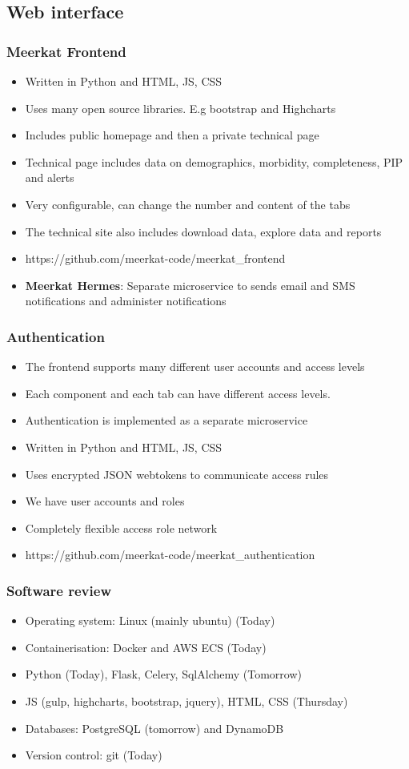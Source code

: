 \documentclass{beamer}
\begin{document}
\subsection{Web interface}
\begin{frame}
  \frametitle{Meerkat Frontend}
  \begin{itemize}
  \item Written in Python and HTML, JS, CSS
  \item Uses many open source libraries. E.g bootstrap and Highcharts
  \item Includes public homepage and then a private technical page
  \item Technical page includes data on demographics, morbidity, completeness, PIP and alerts
  \item Very configurable, can change the number and content of the tabs
  \item The technical site also includes download data, explore data and reports
  \item https://github.com/meerkat-code/meerkat\_frontend
  \item {\bf Meerkat Hermes}: Separate microservice to sends email and SMS notifications and administer notifications
  \end{itemize}
\end{frame}
\begin{frame}
  \frametitle{Authentication}
  \begin{itemize}
  \item The frontend supports many different user accounts and access levels
  \item Each component and each tab can have different access levels. 
  \item Authentication is implemented as a separate microservice
  \item Written in Python and HTML, JS, CSS
  \item Uses encrypted JSON webtokens to communicate access rules
  \item We have user accounts and roles
  \item Completely flexible access role network
  \item https://github.com/meerkat-code/meerkat\_authentication
  \end{itemize}
\end{frame}



\begin{frame}
  \frametitle{Software review}
  \begin{itemize}
  \item Operating system: Linux (mainly ubuntu) (Today)
  \item Containerisation: Docker and AWS ECS (Today)
  \item Python (Today), Flask, Celery, SqlAlchemy (Tomorrow)
  \item JS (gulp, highcharts, bootstrap, jquery), HTML, CSS (Thursday)
  \item Databases: PostgreSQL (tomorrow) and DynamoDB 
  \item Version control: git (Today)
  \end{itemize}
\end{frame}
\end{document}
